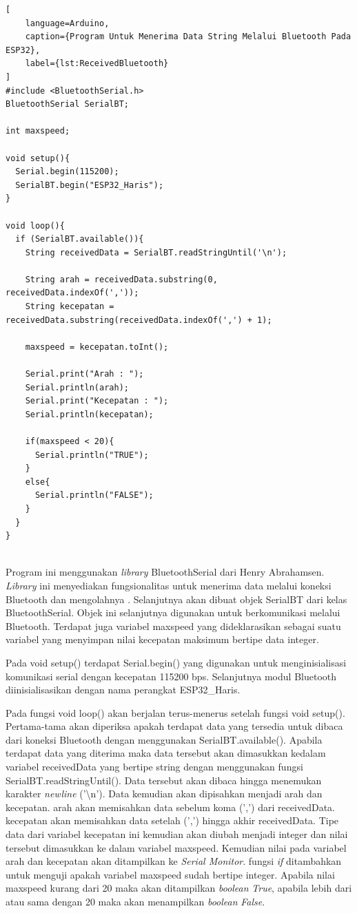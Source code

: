 \begin{lstlisting}[
    language=Arduino,
    caption={Program Untuk Menerima Data String Melalui Bluetooth Pada ESP32},
    label={lst:ReceivedBluetooth}
]
#include <BluetoothSerial.h>
BluetoothSerial SerialBT;

int maxspeed;

void setup(){
  Serial.begin(115200);
  SerialBT.begin("ESP32_Haris");
}

void loop(){
  if (SerialBT.available()){
    String receivedData = SerialBT.readStringUntil('\n');

    String arah = receivedData.substring(0, receivedData.indexOf(','));
    String kecepatan = receivedData.substring(receivedData.indexOf(',') + 1);

    maxspeed = kecepatan.toInt();

    Serial.print("Arah : ");
    Serial.println(arah);
    Serial.print("Kecepatan : ");
    Serial.println(kecepatan);

    if(maxspeed < 20){
      Serial.println("TRUE");
    }
    else{
      Serial.println("FALSE");
    }
  }
}
    
\end{lstlisting}

Program ini menggunakan \emph{library} BluetoothSerial dari Henry Abrahamsen. \emph{Library} ini menyediakan fungsionalitas untuk menerima data melalui koneksi Bluetooth dan mengolahnya \parencite{Abrahamsen_2023}. Selanjutnya akan dibuat objek SerialBT dari kelas BluetoothSerial. Objek ini selanjutnya digunakan untuk berkomunikasi melalui Bluetooth. Terdapat juga variabel maxspeed yang dideklarasikan sebagai suatu variabel yang menyimpan nilai kecepatan maksimum bertipe data integer.

Pada void setup() terdapat Serial.begin() yang digunakan untuk menginisialisasi komunikasi serial dengan kecepatan 115200 bps. Selanjutnya modul Bluetooth diinisialisasikan dengan nama perangkat ESP32\_Haris.

Pada fungsi void loop() akan berjalan terus-menerus setelah fungsi void setup(). Pertama-tama akan diperiksa apakah terdapat data yang tersedia untuk dibaca dari koneksi Bluetooth dengan menggunakan SerialBT.available(). Apabila terdapat data yang diterima maka data tersebut akan dimasukkan kedalam variabel receivedData yang bertipe string dengan menggunakan fungsi SerialBT.readStringUntil(). Data tersebut akan dibaca hingga menemukan karakter \emph{newline} ('\textbackslash n'). Data kemudian akan dipisahkan menjadi arah dan kecepatan. arah akan memisahkan data sebelum koma (',') dari receivedData. kecepatan akan memisahkan data setelah (',') hingga akhir receivedData. Tipe data dari variabel kecepatan ini kemudian akan diubah menjadi integer dan nilai tersebut dimasukkan ke dalam variabel maxspeed. Kemudian nilai pada variabel arah dan kecepatan akan ditampilkan ke \emph{Serial Monitor}. fungsi \emph{if} ditambahkan untuk menguji apakah variabel maxspeed sudah bertipe integer. Apabila nilai maxspeed kurang dari 20 maka akan ditampilkan \emph{boolean} \emph{True}, apabila lebih dari atau sama dengan 20 maka akan menampilkan \emph{boolean} \emph{False}.

